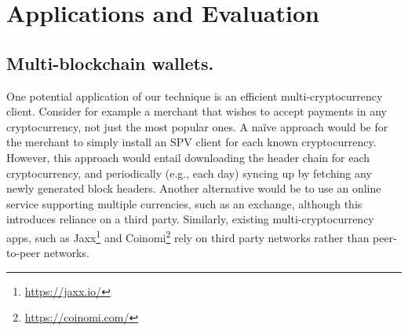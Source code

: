 


\section{Applications and Evaluation}
\label{sec:applications}

\subsection{Multi-blockchain wallets.}
\label{sec:multichain}
One potential application of our technique is an efficient multi-cryptocurrency client.
Consider for example a merchant that wishes to accept payments in any cryptocurrency, not just the most popular ones.
A na\"ive approach would be for the merchant to simply install an SPV client for each known cryptocurrency. However, this approach would entail downloading the header chain for each cryptocurrency, and periodically (e.g., each day) syncing up by fetching any newly generated block headers.
Another alternative would be to use an online service supporting multiple currencies, such as an exchange, although this introduces reliance on a third party. Similarly, existing multi-cryptocurrency apps, such as Jaxx\footnote{\url{https://jaxx.io/}} and Coinomi\footnote{\url{https://coinomi.com/}} rely on third party networks rather than peer-to-peer networks.

